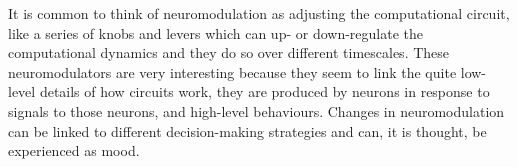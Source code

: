 \documentclass[12pt]{article}
\begin{document}
It is common to think of neuromodulation as adjusting the
computational circuit, like a series of knobs and levers which can up-
or down-regulate the computational dynamics and they do so over
different timescales. These neuromodulators are very interesting
because they seem to link the quite low-level details of how circuits
work, they are produced by neurons in response to signals to those
neurons, and high-level behaviours. Changes in neuromodulation can be
linked to different decision-making strategies and can, it is thought,
be experienced as mood.
\end{document}
